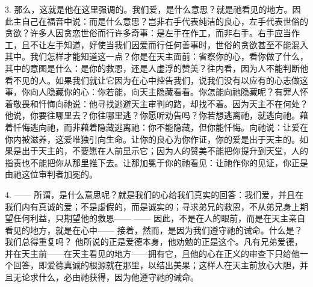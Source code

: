 3. 那么，这就是他在这里强调的。我们爱，是什么意思？就是祂看见的地方。因此主自己在福音中说：而是什么意思？岂非右手代表纯洁的良心，左手代表世俗的贪欲？许多人因贪恋世俗而行许多奇事：是左手在作工，而非右手。右手应当作工，且不让左手知道，好使当我们因爱而行任何善事时，世俗的贪欲甚至不能混入其中。我们怎样才能知道这一点？你是在天主面前：省察你的心，看你做了什么，其中的意图是什么：是你的救恩，还是人虚浮的赞美？往内看，因为人不能判断他看不见的人。如果我们就让它因为在心中控告我们，说我们没有以应有的心志做这事，你向人隐藏你的心：你若能，向天主隐藏看看。你怎能向祂隐藏呢？有罪人怀着敬畏和忏悔向祂说：他寻找逃避天主审判的路，却找不着。因为天主不在何处？他说，你要往哪里去？你往哪里逃？你愿听劝告吗？你若想逃离祂，就逃向祂。藉着忏悔逃向祂，而非藉着隐藏逃离祂：你不能隐藏，但你能忏悔。向祂说：让爱在你内被滋养，这爱唯独引向生命。让你的良心为你作证，你的爱是出于天主的。如果是出于天主的，不要愿在人前显示它；因为人的赞美不能把你提升到天堂，人的指责也不能把你从那里推下去。让那加冕于你的祂看见：让祂作你的见证，你正是由祂这位审判者加冕的。\par

4.   —— 所谓，是什么意思呢？就是我们的心给我们真实的回答：我们爱，并且在我们内有真诚的爱；不是虚假的，而是诚实的；寻求弟兄的救恩，不从弟兄身上期望任何利益，只期望他的救恩——   —— 因此，不是在人的眼前，而是在天主亲自看见的地方，就是在心中—— 接着，然而，是因为我们遵守祂的诫命。什么是？我们总得重复吗？  他所说的正是爱德本身，他劝勉的正是这个。凡有兄弟爱德，并在天主前——在天主看见的地方——拥有它，且他的心在正义的审查下只给他一个回答，即爱德真诚的根源就在那里，以结出美果；这样人在天主前放心大胆，并且无论求什么，必由祂获得，因为他遵守祂的诫命。\par

